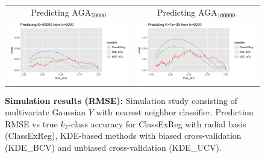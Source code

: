 \documentclass[twoside,11pt]{article}
\newenvironment{myfont}{\fontfamily{phv}\selectfont}{\par}
\begin{document}
\begin{figure}[p]
\begin{tabular}{cc}
\begin{myfont}Predicting $\text{AGA}_{50000}$\end{myfont} &
\begin{myfont}Predicting $\text{AGA}_{100000}$\end{myfont}\\
\includegraphics[scale = 0.5, clip = true, trim = 0 0 1.25in 0.45in]{sim_large7_K50_k5.png} &
\includegraphics[scale = 0.5, clip = true, trim = 0 0 0 0.45in]{sim_large7_K100_k5.png}\\ 
\end{tabular}
\caption{\textbf{Simulation results (RMSE):} Simulation study consisting of
  multivariate Gaussian $Y$ with nearest neighbor classifier.
  Prediction RMSE vs true $k_2$-class accuracy for ClassExReg with radial basis
  (\textsf{ClassExReg}), KDE-based methods with biased cross-validation
  (\textsf{KDE\_BCV}) and unbiased cross-validation (\textsf{KDE\_UCV}).}
\label{fig:sim_study}
\end{figure}
\end{document}
